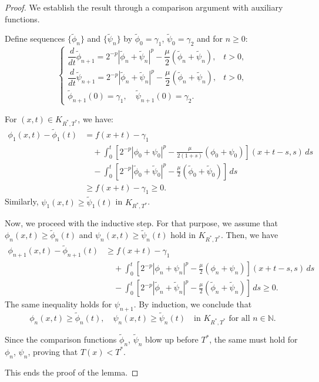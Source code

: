 \documentclass[
  sn-mathphys-num,
  colorlinks,
  linkcolor=darkmagenta,
  citecolor=rufous,
  urlcolor=zaffre,
  hypertexnames=false
]{sn-jnl}
\numberwithin{equation}{section}
\begin{document}
\begin{proof}
We establish the result through a comparison argument with auxiliary functions.


Define sequences $\{\tilde{\phi}_n\}$ and $\{\tilde{\psi}_n\}$ by $\tilde{\phi}_0 = \gamma_1$, $\tilde{\psi}_0 = \gamma_2$ and for $n \geq 0$:
\begin{equation}
\begin{cases}
\dfrac{d}{dt}\tilde{\phi}_{n+1} = 2^{-p} |\tilde{\phi}_n + \tilde{\psi}_n|^p - \dfrac{\mu}{2}(\tilde{\phi}_n + \tilde{\psi}_n), & t > 0, \\[6pt]
\dfrac{d}{dt}\tilde{\psi}_{n+1} = 2^{-p} |\tilde{\phi}_n + \tilde{\psi}_n|^p - \dfrac{\mu}{2}(\tilde{\phi}_n + \tilde{\psi}_n), & t > 0, \\[6pt]
\tilde{\phi}_{n+1}(0) = \gamma_1, \quad \tilde{\psi}_{n+1}(0) = \gamma_2.
\end{cases}
\label{eq:2.9}
\end{equation}


For $(x,t) \in K_{R^*,T^*}$, we have:
\begin{align*}
\phi_1(x,t) - \tilde{\phi}_1(t) 
&= f(x+t) - \gamma_1 \\
&\quad + \int_0^t \left[2^{-p}|\phi_0+\psi_0|^p - \frac{\mu}{2(1+s)}(\phi_0+\psi_0)\right](x+t-s,s)\,ds \\
&\quad - \int_0^t \left[2^{-p}|\tilde{\phi}_0+\tilde{\psi}_0|^p - \frac{\mu}{2}(\tilde{\phi}_0+\tilde{\psi}_0)\right]\,ds \\
&\geq f(x+t) - \gamma_1 \geq 0.
\end{align*}
Similarly, $\psi_1(x,t) \geq \tilde{\psi}_1(t)$ in $K_{R^*,T^*}$.

Now, we proceed with the inductive step. For that purpose, we assume that $\phi_n(x,t) \geq \tilde{\phi}_n(t)$ and $\psi_n(x,t) \geq \tilde{\psi}_n(t)$ hold in $K_{R^*,T^*}$. Then, we have
\begin{align*}
\phi_{n+1}(x,t) - \tilde{\phi}_{n+1}(t) 
&\geq f(x+t) - \gamma_1 \\
&\quad + \int_0^t \left[2^{-p}|\phi_n+\psi_n|^p - \frac{\mu}{2}(\phi_n+\psi_n)\right](x+t-s,s)\,ds \\
&\quad - \int_0^t \left[2^{-p}|\tilde{\phi}_n+\tilde{\psi}_n|^p - \frac{\mu}{2}(\tilde{\phi}_n+\tilde{\psi}_n)\right]\,ds \geq 0.
\end{align*}
The same inequality holds for $\psi_{n+1}$. By induction, we conclude that
$$
\phi_n(x,t) \geq \tilde{\phi}_n(t), \quad \psi_n(x,t) \geq \tilde{\psi}_n(t) \quad \text{in } K_{R^*,T^*} \text{ for all } n \in \mathbb{N}.
$$


Since the comparison functions $\tilde{\phi}_n$, $\tilde{\psi}_n$ blow up before $T^*$, the same must hold for $\phi_n$, $\psi_n$, proving that $T(x) < T^*$.

This ends the proof of the lemma.
\end{proof}
\end{document}
